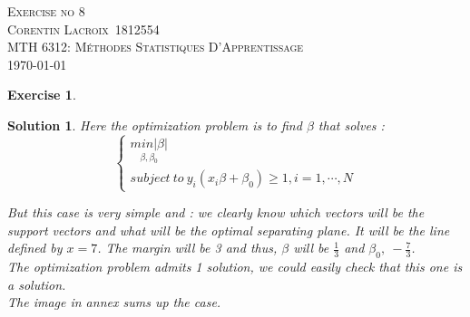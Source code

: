 \documentclass[12pt,a4paper]{article}
\def\StudentName{Corentin Lacroix}
\def\StudentMatricule{1812554}
\def\ExerciseNo{8}
\newtheorem{exercise}{Exercise}
\newtheorem{solution}{Solution}
\begin{document}
\begin{titlepage}
\begin{center}
\textsc{\LARGE Exercise no \ExerciseNo}\\[1.5cm]
\vspace{2in}
\textsc{\Large \StudentName~\StudentMatricule}\\[0.5cm]
\textsc{MTH 6312: Méthodes Statistiques D'Apprentissage}\\[0.5cm]
\today
\end{center}
\end{titlepage}

\begin{exercise}

\end{exercise}
\begin{solution}
Here the optimization problem is to find $\beta$ that solves : 
\[\begin{cases}
     \underset{\beta, \beta_0}{min|\beta|}\\
     subject\ to\ y_i(x_i\beta + \beta_0) \geq 1, i=1,\cdots, N
     \end{cases}\]
     
But this case is very simple and : we clearly know which vectors will be the support vectors and what will be the optimal separating plane. It will be the line defined by $x = 7$. The margin will be 3 and thus, $\beta$ will be $\frac{1}{3}$ and $\beta_0,\ -\frac{7}{3}$.\\

The optimization problem admits 1 solution, we could easily check that this one is a solution.\\

The image in annex sums up the case. 
\end{solution}
\end{document}
